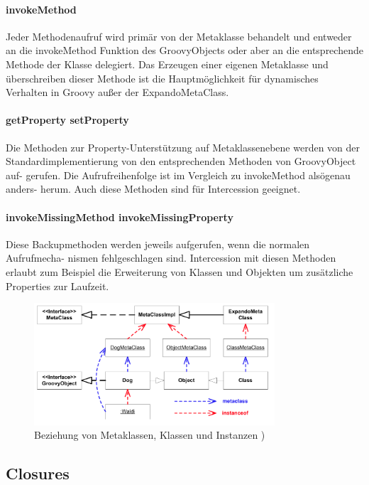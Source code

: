 \documentclass[11pt,english,ngerman, headsepline]{scrreprt}
\begin{document}
\paragraph{ invokeMethod}
Jeder Methodenaufruf wird primär von der Metaklasse behandelt und entweder an
die invokeMethod Funktion des GroovyObjects oder aber an die entsprechende
Methode der Klasse delegiert. Das Erzeugen einer eigenen Metaklasse und
überschreiben dieser Methode ist die Hauptmöglichkeit für dynamisches
Verhalten in Groovy außer der ExpandoMetaClass.
\paragraph{ getProperty setProperty}
Die Methoden zur Property-Unterstützung auf Metaklassenebene werden von der
Standardimplementierung von den entsprechenden Methoden von GroovyObject auf-
gerufen. Die Aufrufreihenfolge ist im Vergleich zu invokeMethod alsögenau
anders- herum. Auch diese Methoden sind für Intercession geeignet.
\paragraph{ invokeMissingMethod invokeMissingProperty}
Diese Backupmethoden werden jeweils aufgerufen, wenn die normalen Aufrufmecha-
nismen fehlgeschlagen sind. Intercession mit diesen Methoden erlaubt zum
Beispiel die Erweiterung von Klassen und Objekten um zusätzliche Properties zur
Laufzeit.
 \cite{mpInGroovy}


\begin{figure}[h!]
	\begin{center}
	\includegraphics[width=0.8\textwidth]{pics/groovyMetaklassen}
	\end{center}
	\caption{Beziehung von Metaklassen, Klassen und Instanzen \cite{mpInGroovy})}
	\label{groovyMetaclassDiagram}
\end{figure}




\subsection{Closures} 
\end{document}
